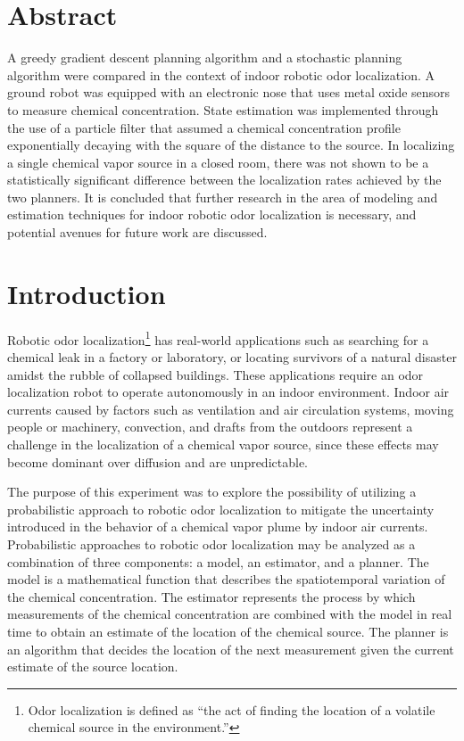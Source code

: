 \documentclass[submit, 12pt]{aiaa-pretty-modified}
\begin{document}


\newpage
\section*{Abstract}
A greedy gradient descent planning algorithm and a stochastic planning algorithm
were compared in the context of indoor robotic odor localization. A ground robot
was equipped with an electronic nose that uses metal oxide sensors to measure
chemical concentration. State estimation was implemented through the use of a
particle filter that assumed a chemical concentration profile exponentially
decaying with the square of the distance to the source. In localizing a single
chemical vapor source in a closed room, there was not shown to be a
statistically significant difference between the localization rates achieved by
the two planners. It is concluded that further research in the area of modeling
and estimation techniques for indoor robotic odor localization is necessary, and
potential avenues for future work are discussed.

\newpage

\tableofcontents

\newpage

\listoffigures

\newpage

\listoftables

\newpage
\onehalfspace

\section{Introduction}

Robotic odor localization\footnote{Odor localization is defined as ``the act of
finding the location of a volatile chemical source in the
environment.''\cite{kowadlo}} has real-world applications such as searching for
a chemical leak in a factory or laboratory, or locating survivors of a natural
disaster amidst the rubble of collapsed buildings. These applications require an
odor localization robot to operate autonomously in an indoor environment. Indoor
air currents caused by factors such as ventilation and air circulation systems,
moving people or machinery, convection, and drafts from the outdoors represent a
challenge in the localization of a chemical vapor source, since these effects
may become dominant over diffusion and are unpredictable.

The purpose of this experiment was to explore the possibility of
utilizing a probabilistic approach to robotic odor localization to mitigate the uncertainty
introduced in the behavior of a chemical vapor plume by indoor
air currents.  Probabilistic approaches to robotic odor localization may be analyzed as a combination of
three components: a model, an estimator, and a planner. The model is a
mathematical function that describes the spatiotemporal variation of the
chemical concentration. The estimator represents the process by which
measurements of the chemical concentration are combined with the model in real time
to obtain an estimate of the location of the chemical source. The planner is an
algorithm that decides the location of the next measurement given the current
estimate of the source location.
\end{document}

